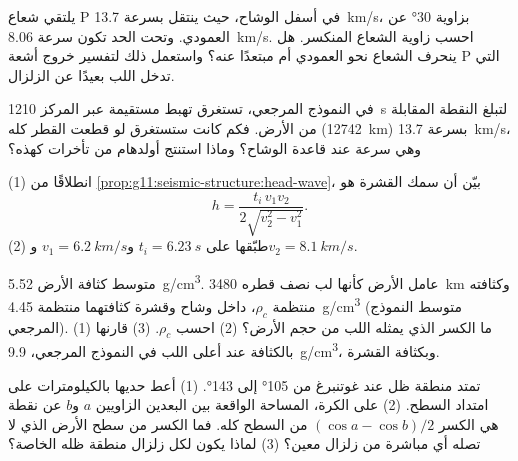 \begin{exercise}[$\star\star$]\label{exo:g11:seismic-structure:10}
يلتقي شعاع P في أسفل الوشاح، حيث ينتقل بسرعة \qty{13.7}{km/s}،
 بزاوية \ang{30} عن العمودي. وتحت الحد
تكون سرعة  \qty{8.06}{km/s}. احسب زاوية الشعاع المنكسر. هل
ينحرف الشعاع نحو العمودي أم مبتعدًا عنه؟ واستعمل ذلك لتفسير خروج أشعة
P التي تدخل اللب بعيدًا عن الزلزال.
\end{exercise}

\begin{exercise}[$\star\star$]\label{exo:g11:seismic-structure:11}
في النموذج المرجعي، تستغرق  تهبط مستقيمة عبر المركز
\qty{1210}{s} لتبلغ النقطة المقابلة من الأرض. فكم كانت ستستغرق
لو قطعت القطر كله (\qty{12742}{km}) بسرعة \qty{13.7}{km/s}، وهي
سرعة  عند قاعدة الوشاح؟ وماذا استنتج أولدهام من تأخرات كهذه؟
\end{exercise}

\begin{exercise}[$\star\star\star$]\label{exo:g11:seismic-structure:12}
(1) انطلاقًا من \cref{prop:g11:seismic-structure:head-wave}، بيّن أن سمك
القشرة هو
\[
  h = \frac{t_i\,v_1 v_2}{2\sqrt{v_2^2 - v_1^2}}.
\]
(2) طبّقها على $t_i = \qty{6.23}{s}$ و$v_1 = \qty{6.2}{km/s}$
و$v_2 = \qty{8.1}{km/s}$.
\end{exercise}

\begin{exercise}[$\star\star\star$]\label{exo:g11:seismic-structure:13}
متوسط كثافة الأرض \qty{5.52}{g/cm^3}. عامل الأرض كأنها
لب نصف قطره \qty{3480}{km} وكثافته منتظمة $\rho_c$، داخل وشاح
وقشرة كثافتهما منتظمة \qty{4.45}{g/cm^3} (متوسط النموذج
المرجعي). (1) ما الكسر الذي يمثله اللب من حجم الأرض؟ (2) احسب
$\rho_c$. (3) قارنها بالكثافة عند أعلى اللب في
النموذج المرجعي، \qty{9.9}{g/cm^3}، وبكثافة القشرة.
\end{exercise}

\begin{exercise}[$\star\star\star$]\label{exo:g11:seismic-structure:14}
تمتد منطقة ظل  عند غوتنبرغ من \ang{105} إلى \ang{143}. (1) أعط
حديها بالكيلومترات على امتداد السطح. (2) على الكرة، المساحة الواقعة بين
البعدين الزاويين $a$ و$b$ عن نقطة هي الكسر $(\cos a - \cos
b)/2$ من السطح كله. فما الكسر من سطح الأرض الذي لا تصله أي
 مباشرة من زلزال معين؟ (3) لماذا يكون لكل زلزال
منطقة ظله الخاصة؟
\end{exercise}

